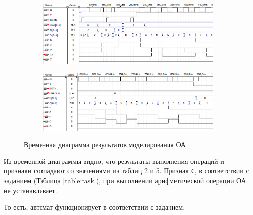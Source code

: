 \begin{figure}[H]
	\begin{subfigure}[b]{0.95\textwidth}
		\includegraphics[scale=0.5]{images/altera/rev3/00.png}
		\caption{}
	\end{subfigure}
	
	\begin{subfigure}[b]{1\textwidth}
		\includegraphics[scale=0.5]{images/altera/rev3/01.png}
		\caption{}
	\end{subfigure}
	\caption{Временная диаграмма результатов моделирования ОА}
	\label{figure:oafin0test}
\end{figure}

Из временной диаграммы видно, что результаты выполнения операций и признаки совпадают со значениями из таблиц 2 и 5. Признак \texttt{C}, в соответствии с заданием (Таблица \ref{table:task}), при выполнении арифметической операции ОА не устанавливает.

То есть, автомат функционирует в соответствии с заданием.

